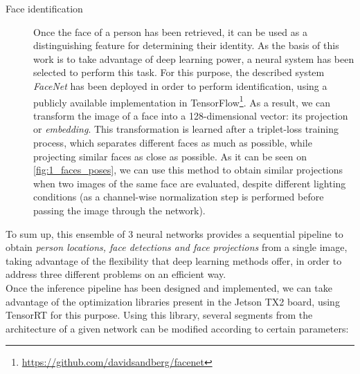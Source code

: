 \begin{description}
	\item[Face identification] Once the face of a person has been retrieved, it can be used as a distinguishing feature for determining their identity. As the basis of this work is to take advantage of deep learning power, a neural system has been selected to perform this task. For this purpose, the described system \textit{FaceNet} has been deployed in order to perform identification, using a publicly available implementation in TensorFlow\footnote{\url{https://github.com/davidsandberg/facenet}}. As a result, we can transform the image of a face into a 128-dimensional vector: its projection or \textit{embedding}. This transformation is learned after a triplet-loss training process, which separates different faces as much as possible, while projecting similar faces as close as possible. As it can be seen on \autoref{fig:1_faces_poses}, we can use this method to obtain similar projections when two images of the same face are evaluated, despite different lighting conditions (as a channel-wise normalization step is performed before passing the image through the network).
	
\end{description}

To sum up, this ensemble of 3 neural networks provides a sequential pipeline to obtain \textit{person locations, face detections and face projections} from a single image, taking advantage of the flexibility that deep learning methods offer, in order to address three different problems on an efficient way.\\

Once the inference pipeline has been designed and implemented, we can take advantage of the optimization libraries present in the Jetson TX2 board, using TensorRT for this purpose. Using this library, several segments from the architecture of a given network can be modified according to certain parameters:

